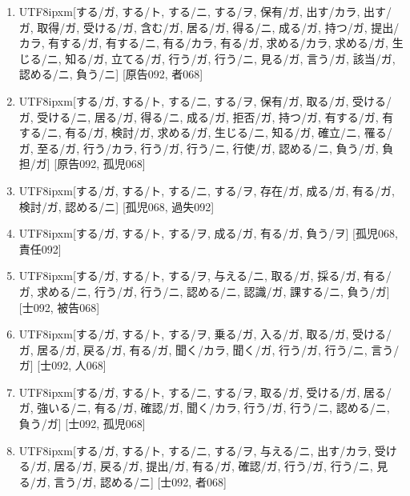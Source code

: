 \begin{enumerate}
\item \begin{CJK}{UTF8}{ipxm}[する/ガ, する/ト, する/ニ, する/ヲ, 保有/ガ, 出す/カラ, 出す/ガ, 取得/ガ, 受ける/ガ, 含む/ガ, 居る/ガ, 得る/ニ, 成る/ガ, 持つ/ガ, 提出/カラ, 有する/ガ, 有する/ニ, 有る/カラ, 有る/ガ, 求める/カラ, 求める/ガ, 生じる/ニ, 知る/ガ, 立てる/ガ, 行う/ガ, 行う/ニ, 見る/ガ, 言う/ガ, 該当/ガ, 認める/ニ, 負う/ニ] [原告092, 者068]\end{CJK}
\item \begin{CJK}{UTF8}{ipxm}[する/ガ, する/ト, する/ニ, する/ヲ, 保有/ガ, 取る/ガ, 受ける/ガ, 受ける/ニ, 居る/ガ, 得る/ニ, 成る/ガ, 拒否/ガ, 持つ/ガ, 有する/ガ, 有する/ニ, 有る/ガ, 検討/ガ, 求める/ガ, 生じる/ニ, 知る/ガ, 確立/ニ, 罹る/ガ, 至る/ガ, 行う/カラ, 行う/ガ, 行う/ニ, 行使/ガ, 認める/ニ, 負う/ガ, 負担/ガ] [原告092, 孤児068]\end{CJK}
\item \begin{CJK}{UTF8}{ipxm}[する/ガ, する/ト, する/ニ, する/ヲ, 存在/ガ, 成る/ガ, 有る/ガ, 検討/ガ, 認める/ニ] [孤児068, 過失092]\end{CJK}
\item \begin{CJK}{UTF8}{ipxm}[する/ガ, する/ト, する/ヲ, 成る/ガ, 有る/ガ, 負う/ヲ] [孤児068, 責任092]\end{CJK}
\item \begin{CJK}{UTF8}{ipxm}[する/ガ, する/ト, する/ヲ, 与える/ニ, 取る/ガ, 採る/ガ, 有る/ガ, 求める/ニ, 行う/ガ, 行う/ニ, 認める/ニ, 認識/ガ, 課する/ニ, 負う/ガ] [士092, 被告068]\end{CJK}
\item \begin{CJK}{UTF8}{ipxm}[する/ガ, する/ト, する/ヲ, 乗る/ガ, 入る/ガ, 取る/ガ, 受ける/ガ, 居る/ガ, 戻る/ガ, 有る/ガ, 聞く/カラ, 聞く/ガ, 行う/ガ, 行う/ニ, 言う/ガ] [士092, 人068]\end{CJK}
\item \begin{CJK}{UTF8}{ipxm}[する/ガ, する/ト, する/ニ, する/ヲ, 取る/ガ, 受ける/ガ, 居る/ガ, 強いる/ニ, 有る/ガ, 確認/ガ, 聞く/カラ, 行う/ガ, 行う/ニ, 認める/ニ, 負う/ガ] [士092, 孤児068]\end{CJK}
\item \begin{CJK}{UTF8}{ipxm}[する/ガ, する/ト, する/ニ, する/ヲ, 与える/ニ, 出す/カラ, 受ける/ガ, 居る/ガ, 戻る/ガ, 提出/ガ, 有る/ガ, 確認/ガ, 行う/ガ, 行う/ニ, 見る/ガ, 言う/ガ, 認める/ニ] [士092, 者068]\end{CJK}

\end{enumerate}
